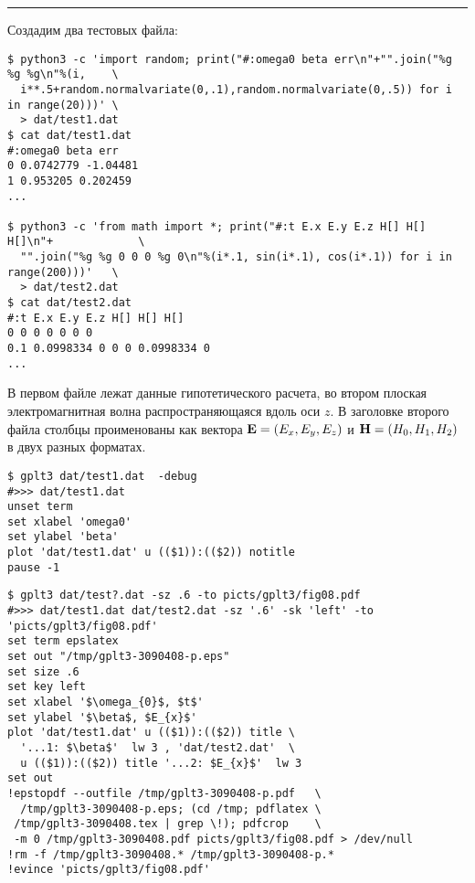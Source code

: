 \documentclass[12pt]{article}
\begin{document}
\hrule %

\vspace{3mm}
Создадим два тестовых файла:
{\small
\begin{verbatim}
$ python3 -c 'import random; print("#:omega0 beta err\n"+"".join("%g %g %g\n"%(i,    \
  i**.5+random.normalvariate(0,.1),random.normalvariate(0,.5)) for i in range(20)))' \
  > dat/test1.dat
$ cat dat/test1.dat
#:omega0 beta err
0 0.0742779 -1.04481
1 0.953205 0.202459
...

$ python3 -c 'from math import *; print("#:t E.x E.y E.z H[] H[] H[]\n"+             \
  "".join("%g %g 0 0 0 %g 0\n"%(i*.1, sin(i*.1), cos(i*.1)) for i in range(200)))'   \
  > dat/test2.dat
$ cat dat/test2.dat
#:t E.x E.y E.z H[] H[] H[]
0 0 0 0 0 0 0
0.1 0.0998334 0 0 0 0.0998334 0
...

\end{verbatim}
}
В первом файле лежат данные гипотетического расчета, во втором плоская электромагнитная волна распространяющаяся
вдоль оси $z$. В заголовке второго файла столбцы проименованы как вектора ${\bf E}=(E_x, E_y, E_z)$ и ${\bf H}=(H_0, H_1, H_2)$ в двух разных форматах.\\

\noindent
\begin{minipage}[b]{.69\textwidth}
  \small
\begin{verbatim}
$ gplt3 dat/test1.dat  -debug
#>>> dat/test1.dat
unset term
set xlabel 'omega0'
set ylabel 'beta'
plot 'dat/test1.dat' u (($1)):(($2)) notitle   
pause -1
\end{verbatim}
\end{minipage}

\noindent
\begin{minipage}[b]{.54\textwidth}
  \small
\begin{verbatim}
$ gplt3 dat/test?.dat -sz .6 -to picts/gplt3/fig08.pdf
#>>> dat/test1.dat dat/test2.dat -sz '.6' -sk 'left' -to 'picts/gplt3/fig08.pdf'
set term epslatex 
set out "/tmp/gplt3-3090408-p.eps"
set size .6
set key left
set xlabel '$\omega_{0}$, $t$'
set ylabel '$\beta$, $E_{x}$'
plot 'dat/test1.dat' u (($1)):(($2)) title \
  '...1: $\beta$'  lw 3 , 'dat/test2.dat'  \
  u (($1)):(($2)) title '...2: $E_{x}$'  lw 3 
set out
!epstopdf --outfile /tmp/gplt3-3090408-p.pdf   \
  /tmp/gplt3-3090408-p.eps; (cd /tmp; pdflatex \
 /tmp/gplt3-3090408.tex | grep \!); pdfcrop    \
 -m 0 /tmp/gplt3-3090408.pdf picts/gplt3/fig08.pdf > /dev/null
!rm -f /tmp/gplt3-3090408.* /tmp/gplt3-3090408-p.*
!evince 'picts/gplt3/fig08.pdf'
\end{verbatim}
\end{minipage}
\end{document}

